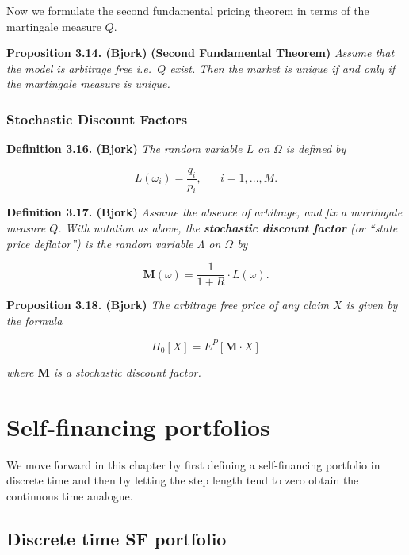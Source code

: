 \documentclass[a4paper,12pt,openany]{book}
\begin{document}
Now we formulate the second fundamental pricing theorem in terms of the martingale measure \(Q\).

\textbf{Proposition 3.14. (Bjork)} \textbf{(Second Fundamental Theorem)} \emph{Assume that the model is arbitrage free i.e.~\(Q\) exist. Then the market is unique if and only if the martingale measure is unique.}

\hypertarget{stochastic-discount-factors}{%
\subsubsection{Stochastic Discount Factors}\label{stochastic-discount-factors}}

\textbf{Definition 3.16. (Bjork)} \emph{The random variable \(L\) on \(\Omega\) is defined by}

\[
L(\omega_i)=\frac{q_i}{p_i},\hspace{20pt} i=1,...,M.
\]

\textbf{Definition 3.17. (Bjork)} \emph{Assume the absence of arbitrage, and fix a martingale measure \(Q\). With notation as above, the \textbf{stochastic discount factor} (or ``state price deflator'') is the random variable \(\Lambda\) on \(\Omega\) by}

\[
\mathbf{M}(\omega)=\frac{1}{1+R}\cdot L(\omega).\tag{3.19}
\]

\textbf{Proposition 3.18. (Bjork)} \emph{The arbitrage free price of any claim \(X\) is given by the formula}

\[
\Pi_0[X]=E^P[\mathbf{M}\cdot X]\tag{3.20}
\]

\emph{where \(\mathbf{M}\) is a stochastic discount factor.}

\hypertarget{self-financing-portfolios}{%
\section{Self-financing portfolios}\label{self-financing-portfolios}}

We move forward in this chapter by first defining a self-financing portfolio in discrete time and then by letting the step length tend to zero obtain the continuous time analogue.

\hypertarget{discrete-time-sf-portfolio}{%
\subsection{Discrete time SF portfolio}\label{discrete-time-sf-portfolio}}
\end{document}
